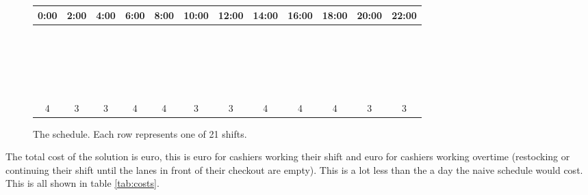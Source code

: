 \newcommand{\cc}{\cellcolor{cyan}}

\begin{figure}
	\centering

	\renewcommand{\arraystretch}{0.6} %
	
\begin{tabular}{|c|c|c|c|c|c|c|c|c|c|c|c|}
	\hline
	0:00 & 2:00 & 4:00 & 6:00 & 8:00 & 10:00 & 12:00 & 14:00 & 16:00 & 18:00 & 20:00 & 22:00  \\
	\hline
	\hline
	\cc & \cc & & & & & & & & & & \\ \hline 
	& \cc & \cc & & & & & & & & & \\ \hline
	& \cc & \cc & & & & & & & & & \\ \hline
	& & \cc & \cc & & & & & & & & \\ \hline
	& & & \cc & \cc & & & & & & & \\ \hline
	& & & \cc & \cc & & & & & & & \\ \hline
	& & & \cc & \cc & & & & & & & \\ \hline
	& & & & \cc & \cc & & & & & & \\ \hline
	& & & & & \cc & \cc & & & & & \\ \hline
	& & & & & \cc & \cc & & & & & \\ \hline
	& & & & & & \cc & \cc & & & & \\ \hline
	& & & & & & & \cc & \cc & & & \\ \hline
	& & & & & & & \cc & \cc & & & \\ \hline
	& & & & & & & \cc & \cc & & & \\ \hline
	& & & & & & & & \cc & \cc & & \\ \hline
	& & & & & & & & & \cc & \cc & \\ \hline
	& & & & & & & & & \cc & \cc & \\ \hline
	& & & & & & & & & \cc & \cc & \\ \hline
	\cc & & & & & & & & & & & \cc \\ \hline
	\cc & & & & & & & & & & & \cc \\ \hline
	\cc & & & & & & & & & & & \cc \\ 
	\hline
	\hline
	4 & 3 & 3 & 4 & 4 & 3 & 3 & 4 & 4 & 4 & 3 & 3\\
	\hline
\end{tabular}
\caption{The schedule. Each row represents one of 21 shifts.}
\label{fig:schedule}
\end{figure}

The total cost of the solution is  euro, this is  euro for cashiers working their shift and  euro for cashiers working overtime (restocking or continuing their shift until the lanes in front of their checkout are empty). 
This is a lot less than the  a day the naive schedule would cost.
This is all shown in table \autoref{tab:costs}.

